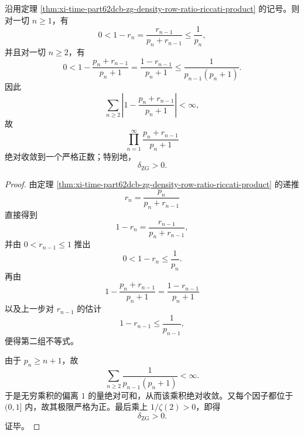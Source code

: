 \begin{corollary}\label{cor:xi-time-part62dcb-zg-density-second-order-summability}
沿用定理 \ref{thm:xi-time-part62dcb-zg-density-row-ratio-riccati-product} 的记号。则对一切 \(n\ge 1\)，有
\[
0<1-r_n=\frac{r_{n-1}}{p_n+r_{n-1}}\le \frac{1}{p_n},
\]
并且对一切 \(n\ge 2\)，有
\[
0<
1-\frac{p_n+r_{n-1}}{p_n+1}
=
\frac{1-r_{n-1}}{p_n+1}
\le
\frac{1}{p_{n-1}(p_n+1)}.
\]
因此
\[
\sum_{n\ge 2}\left|1-\frac{p_n+r_{n-1}}{p_n+1}\right|<\infty,
\]
故
\[
\prod_{n=1}^{\infty}\frac{p_n+r_{n-1}}{p_n+1}
\]
绝对收敛到一个严格正数；特别地，
\[
\delta_{\mathrm{ZG}}>0.
\]
\end{corollary}
\begin{proof}
由定理 \ref{thm:xi-time-part62dcb-zg-density-row-ratio-riccati-product} 的递推
\[
r_n=\frac{p_n}{p_n+r_{n-1}}
\]
直接得到
\[
1-r_n=\frac{r_{n-1}}{p_n+r_{n-1}},
\]
并由 \(0<r_{n-1}\le 1\) 推出
\[
0<1-r_n\le \frac{1}{p_n}.
\]
再由
\[
1-\frac{p_n+r_{n-1}}{p_n+1}
=
\frac{1-r_{n-1}}{p_n+1}
\]
以及上一步对 \(r_{n-1}\) 的估计
\[
1-r_{n-1}\le \frac{1}{p_{n-1}},
\]
便得第二组不等式。

由于 \(p_n\ge n+1\)，故
\[
\sum_{n\ge 2}\frac{1}{p_{n-1}(p_n+1)}<\infty.
\]
于是无穷乘积的偏离 \(1\) 的量绝对可和，从而该乘积绝对收敛。又每个因子都位于 \((0,1]\) 内，故其极限严格为正。最后乘上 \(1/\zeta(2)>0\)，即得
\[
\delta_{\mathrm{ZG}}>0.
\]
证毕。
\end{proof}

